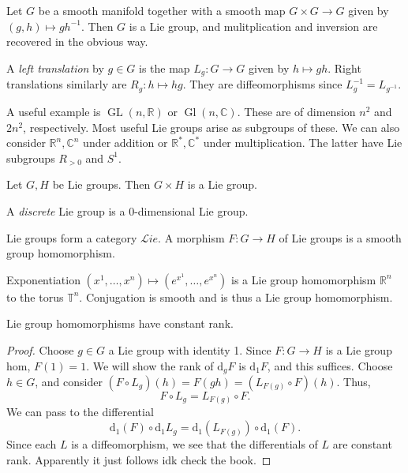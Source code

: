 \begin{proposition}\label{3.0.2}
	Let $G$ be a smooth manifold together with a smooth map $G\times G\to G$ given by $(g,h)\mapsto gh^{-1} $. Then $G$ is a Lie group, and mulitplication and inversion are recovered in the obvious way.
\end{proposition}

\begin{definition}\label{3.0.3}
	A \emph{left translation} by $g\in G$ is the map $L_g : G \to G$ given by $h\mapsto gh$. Right translations similarly are $R_g : h\mapsto hg$. They are diffeomorphisms since $L_g^{-1} =L_{g^{-1} } $.
\end{definition}

A useful example is $\operatorname{GL} (n,\mathbb{R} )$ or $\operatorname{Gl} (n,\mathbb{C} )$. These are of dimension $n^2$ and $2n^2$, respectively. Most useful Lie groups arise as subgroups of these. We can also consider $\mathbb{R} ^n,\mathbb{C} ^n$ under addition or $\mathbb{R} ^*,\mathbb{C} ^*$ under multiplication. The latter have Lie subgroups $R_{>0} $ and $S^1$.

\begin{proposition}\label{3.0.4}
	Let $G,H$ be Lie groups. Then $G\times H$ is a Lie group.
\end{proposition}

\begin{definition}\label{3.0.5}
	A \emph{discrete} Lie group is a 0-dimensional Lie group.
\end{definition}

\begin{definition}\label{3.0.6}
	Lie groups form a category $\mathcal{L} ie$. A morphism $F : G \to H$ of Lie groups is a smooth group homomorphism.
\end{definition}

Exponentiation $(x^1, \ldots ,x^n)\mapsto (e^{x^1} , \ldots ,e^{x^n} )$ is a Lie group homomorphism $\mathbb{R} ^n$ to the torus $\mathbb{T} ^n$. Conjugation is smooth and is thus a Lie group homomorphism.


\begin{theorem}\label{3.0.7}
	Lie group homomorphisms have constant rank.
\end{theorem}
\begin{proof}
	Choose $g\in G $ a Lie group with identity 1. Since $F : G \to H$ is a Lie group hom, $F(1)=1$. We will show the rank of $\mathrm{d} _gF$ is $\mathrm{d} _1F$, and this suffices. Choose $h\in G$, and consider $(F\circ L_g)(h)=F(gh)=(L_{F(g)} \circ F)(h)$. Thus,
	\[
		F\circ L_g=L_{F(g)} \circ F
	.\]
	We can pass to the differential
	\[
		\mathrm{d}_1(F)\circ \mathrm{d}_1L_g = \mathrm{d} _1(L_{F(g)} )\circ \mathrm{d} _1(F)
	.\]
	Since each $L$ is a diffeomorphism, we see that the differentials of $L$ are constant rank. Apparently it just follows idk check the book.
\end{proof}

